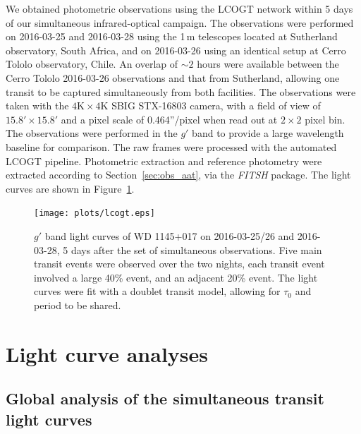 \documentclass[apj]{emulateapj}
\begin{document}
We obtained photometric observations using the LCOGT network \citep{2013PASP..125.1031B} within 5 days of our simultaneous infrared-optical campaign. The observations were performed on 2016-03-25 and 2016-03-28 using the 1\,m telescopes located at Sutherland observatory, South Africa, and on 2016-03-26 using an identical setup at Cerro Tololo observatory, Chile. An overlap of $\sim 2$ hours were available between the Cerro Tololo 2016-03-26 observations and that from Sutherland, allowing one transit to be captured simultaneously from both facilities. The observations were taken with the $4\mathrm{K} \times 4 \mathrm{K}$ SBIG STX-16803 camera, with a field of view of $15.8'\times 15.8'$ and a pixel scale of 0.464''/pixel when read out at $2\times 2$ pixel bin. The observations were performed in the $g'$ band to provide a large wavelength baseline for comparison. The raw frames were processed with the automated LCOGT pipeline. Photometric extraction and reference photometry were extracted according to Section~\ref{sec:obs_aat}, via the \emph{FITSH} package. The light curves are shown in Figure~\ref{fig:lcogt}.

\begin{figure}
    \vspace{5mm}
    \centering
    \texttt{[image: plots/lcogt.eps]}
    \caption{$g'$ band light curves of WD 1145+017 on 2016-03-25/26 and 2016-03-28, 5 days after the set of simultaneous observations. Five main transit events were observed over the two nights, each transit event involved a large 40\% event, and an adjacent 20\% event. The light curves were fit with a doublet transit model, allowing for $\tau_0$ and period to be shared.}
    \label{fig:lcogt}
\end{figure}



\section{Light curve analyses}
\label{sec:lightcurve_model}

\subsection{Global analysis of the simultaneous transit light curves}
\label{sec:simultaneous_lc}
\end{document}

